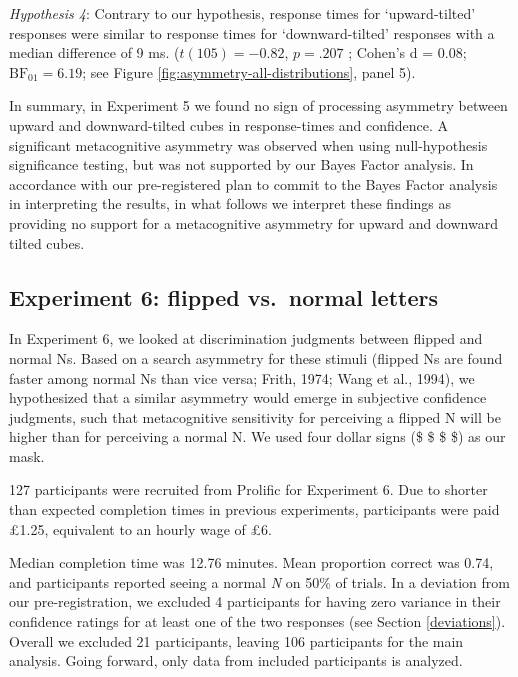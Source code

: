 \documentclass[12pt,twoside]{reedthesis}
\begin{document}
\emph{Hypothesis 4}: Contrary to our hypothesis, response times for `upward-tilted' responses were similar to response times for `downward-tilted' responses with a median difference of 9 ms. (\(t(105) = -0.82\), \(p = .207\) ; Cohen's d = 0.08; \(\mathrm{BF}_{\textrm{01}} = 6.19\); see Figure \ref{fig:asymmetry-all-distributions}, panel 5).

In summary, in Experiment 5 we found no sign of processing asymmetry between upward and downward-tilted cubes in response-times and confidence. A significant metacognitive asymmetry was observed when using null-hypothesis significance testing, but was not supported by our Bayes Factor analysis. In accordance with our pre-registered plan to commit to the Bayes Factor analysis in interpreting the results, in what follows we interpret these findings as providing no support for a metacognitive asymmetry for upward and downward tilted cubes.

\hypertarget{experiment-6-flipped-vs.-normal-letters}{%
\subsection{Experiment 6: flipped vs.~normal letters}\label{experiment-6-flipped-vs.-normal-letters}}

In Experiment 6, we looked at discrimination judgments between flipped and normal Ns. Based on a search asymmetry for these stimuli (flipped Ns are found faster among normal Ns than vice versa; Frith, 1974; Wang et al., 1994), we hypothesized that a similar asymmetry would emerge in subjective confidence judgments, such that metacognitive sensitivity for perceiving a flipped N will be higher than for perceiving a normal N. We used four dollar signs (\$ \$ \$ \$) as our mask.

127 participants were recruited from Prolific for Experiment 6. Due to shorter than expected completion times in previous experiments, participants were paid £1.25, equivalent to an hourly wage of £6.

Median completion time was 12.76 minutes. Mean proportion correct was 0.74, and participants reported seeing a normal \emph{N} on 50\% of trials. In a deviation from our pre-registration, we excluded 4 participants for having zero variance in their confidence ratings for at least one of the two responses (see Section \ref{deviations}). Overall we excluded 21 participants, leaving 106 participants for the main analysis. Going forward, only data from included participants is analyzed.
\end{document}
